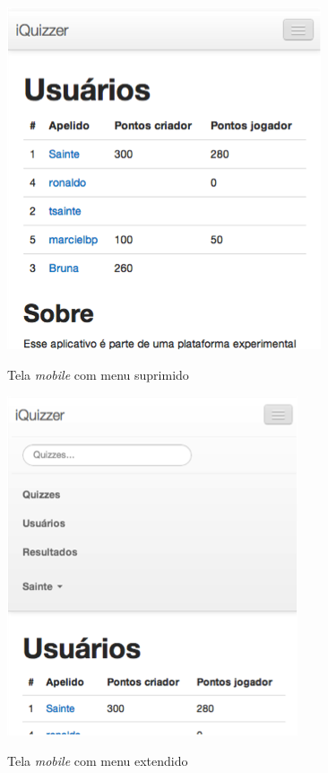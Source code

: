 	 \begin{figure}[H]
	   \centering
	   \includegraphics{figs/bootstraplayout2.png}\\
	   \caption{ Tela \emph{mobile} com menu suprimido }
	   \label{FIG:bootstrapcontrol}
	 \end{figure}
	 \begin{figure}[H]
	   \centering
	   \includegraphics{figs/bootstraplayout3.png}\\
	   \caption{ Tela \emph{mobile} com menu extendido }
	   \label{FIG:bootstrapcontrol}
	 \end{figure}

